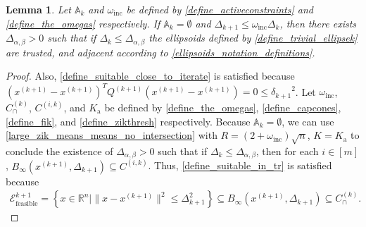 \documentclass{article}
\newtheorem{lemma}[theorem]{Lemma}
\theoremstyle{case}
\numberwithin{theorem}{subsection}
\newcommand{\activeconstraintsk}{{\mathbb A_{k}}}
\newcommand{\capcones}{{C^{(k)}_{\cap}}}
\newcommand{\deltalargzik}{{\Delta_{\alpha,\beta}}}
\newcommand{\dk}{\Delta_k}
\newcommand{\dkpo}{\Delta_{k+1}}
\newcommand{\hgik}{{\frac{\nabla m^{(k)}_{c_i}(\xk)}{\|\nabla m^{(k)}_{c_i}\left(\xk\right)\|}}}
\newcommand{\omegainc}{\omega_{\text{inc}}}
\newcommand{\Rn}{\mathbb R^n}
\newcommand{\trkpo}{{ B_{\infty}\left(\xkpo, \dkpo\right) }}
\newcommand{\xkpo}{{{x}^{(k+1)}}}
\newcommand{\xk}{x^{(k)}}
\newcommand{\zik}{{z^{(i, k)}}}
\newcommand{\qkpo}{{Q^{(k+1)}}}
\newcommand{\sdkpo}{{\delta_{k+1}}}
\newcommand{\unshiftedellipsoidkpo}{{\mathcal E^{k+1}_{\textrm{feasible}}}}
\newcommand{\fik}{{C^{(i, k)}}}
\newcommand{\zikthresh}{{ K_{\textrm{a}} }}
\begin{document}


\begin{lemma}
\label{ellsoid_is_suitable_theorem_p1}
Let $\activeconstraintsk$ and $\omegainc$ be defined by \cref{define_activeconstraints} and \cref{define_the_omegas} respectively.
If $\activeconstraintsk = \emptyset$ and $\dkpo \le \omegainc\dk$, 
then there exists $\deltalargzik>0$ such that if $\dk \le \deltalargzik$ the
ellipsoids defined by \cref{define_trivial_ellipsek} 
are trusted, and adjacent according to \cref{ellipsoids_notation_definitions}.

\end{lemma}
\begin{proof}
Also, \cref{define_suitable_close_to_iterate} is satisfied because $(\xkpo - \xkpo)^T\qkpo(\xkpo - \xkpo) = 0 \le \sdkpo^2$.
Let $\omegainc$, $\capcones$, $\fik$, and $\zikthresh$ be defined by \cref{define_the_omegas}, \cref{define_capcones}, \cref{define_fik}, and \cref{define_zikthresh} respectively.
Because $\activeconstraintsk = \emptyset$, we can use 
\cref{large_zik_means_means_no_intersection} with $R = (2 + \omegainc)\sqrt{n}$, $K = \zikthresh$ to conclude the existence of $\deltalargzik > 0$ such that 
if $\dk \le \deltalargzik$, then for each 
$i \in [m]$, $\trkpo \subseteq \fik$.
Thus, \cref{define_suitable_in_tr} is satisfied because 
\begin{align*}
\unshiftedellipsoidkpo = \left\{x \in \Rn \bigg| \|x - \xkpo\|^2 \le \dkpo^2 \right\} \subseteq \trkpo \subseteq \capcones.
\end{align*}
\end{proof}
\end{document}
